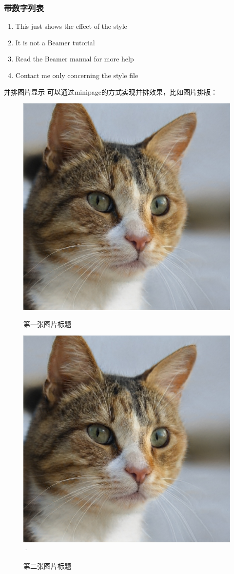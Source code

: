 \documentclass[10pt,aspectratio=169,mathserif]{beamer}
\begin{document}
\begin{frame}
	\frametitle{带数字列表}
	\begin{enumerate}
		\item This just shows the effect of the style
		\item It is not a Beamer tutorial
		\item Read the Beamer manual for more help
		\item Contact me only concerning the style file
	\end{enumerate}
\end{frame}

\begin{frame}{并排图片显示}
可以通过minipage的方式实现并排效果，比如图片排版：
	\begin{figure}[ht]
		\centering
		\begin{minipage}[b]{0.45\linewidth} %
			\centering
			\includegraphics[width=0.5\linewidth]{example.png}
			\caption{第一张图片标题}
			\label{fig:image1}
		\end{minipage}
		\hfill %
		\begin{minipage}[b]{0.45\linewidth} %
			\centering
			\includegraphics[width=0.5\linewidth]{example.png}·
			\caption{第二张图片标题}
			\label{fig:image2}
		\end{minipage}
	\end{figure}
\end{frame}
	
\end{document}

